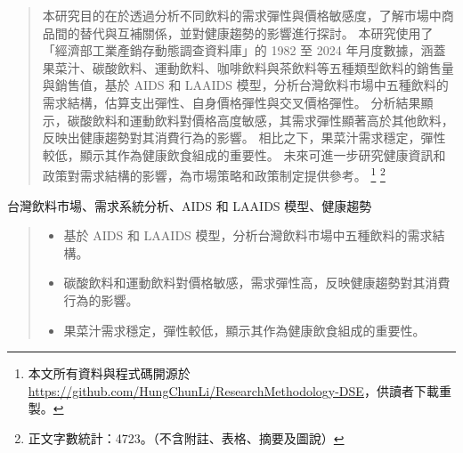 \begin{abstract}
    本研究目的在於透過分析不同飲料的需求彈性與價格敏感度，了解市場中商品間的替代與互補關係，並對健康趨勢的影響進行探討。
    本研究使用了「經濟部工業產銷存動態調查資料庫」的 1982 至 2024 年月度數據，涵蓋果菜汁、碳酸飲料、運動飲料、咖啡飲料與茶飲料等五種類型飲料的銷售量與銷售值，基於 AIDS 和 LAAIDS 模型，分析台灣飲料市場中五種飲料的需求結構，估算支出彈性、自身價格彈性與交叉價格彈性。
    分析結果顯示，碳酸飲料和運動飲料對價格高度敏感，其需求彈性顯著高於其他飲料，反映出健康趨勢對其消費行為的影響。
    相比之下，果菜汁需求穩定，彈性較低，顯示其作為健康飲食組成的重要性。
    未來可進一步研究健康資訊和政策對需求結構的影響，為市場策略和政策制定提供參考。
    \footnote{本文所有資料與程式碼開源於 \url{https://github.com/HungChunLi/ResearchMethodology-DSE}，供讀者下載重製。}
    \footnote{正文字數統計：4723。（不含附註、表格、摘要及圖說）}
\end{abstract}
\vspace{-0.7cm}
\begin{keywords}
    台灣飲料市場、需求系統分析、AIDS 和 LAAIDS 模型、健康趨勢
\end{keywords}
\vspace{-0.7cm}
\renewcommand{\abstractname}{文章重點} %
\begin{abstract}
    \vspace{-7ex} %
    \noindent 
    \begin{itemize}
        \item[1] 基於 AIDS 和 LAAIDS 模型，分析台灣飲料市場中五種飲料的需求結構。
        \item[2] 碳酸飲料和運動飲料對價格敏感，需求彈性高，反映健康趨勢對其消費行為的影響。
        \item[3] 果菜汁需求穩定，彈性較低，顯示其作為健康飲食組成的重要性。 
    \end{itemize}
\end{abstract}